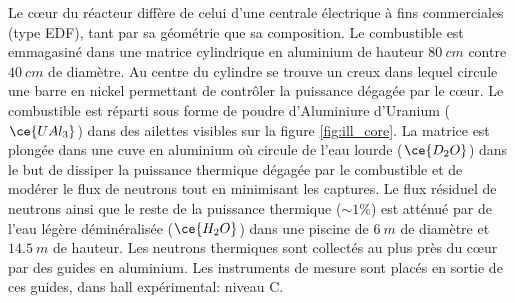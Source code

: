 Le c\oe ur du réacteur diffère de celui d'une centrale électrique à fins commerciales (type EDF), tant par sa géométrie que sa composition. Le combustible est emmagasiné dans une matrice cylindrique en aluminium de hauteur $\SI{80}{cm}$ contre $\SI{40}{cm}$ de diamètre. Au centre du cylindre se trouve un creux dans lequel circule une barre en nickel permettant de contrôler la puissance dégagée par le c\oe ur. Le combustible est réparti sous forme de poudre d'Aluminiure d'Uranium ($\ce{UAl_3}$) \cite{BIST:ILL:1971} dans des ailettes visibles sur la figure \ref{fig:ill_core}. La matrice est plongée dans une cuve en aluminium où circule de l'eau lourde ($\ce{D_2O}$) dans le but de dissiper la puissance thermique dégagée par le combustible et de modérer le flux de neutrons tout en minimisant les captures. Le flux résiduel de neutrons ainsi que le reste de la puissance thermique ($\sim 1 \%$) est atténué par de l'eau légère déminéralisée ($\ce{H_2O}$) dans une piscine de $\SI{6}{m}$ de diamètre et $\SI{14.5}{m}$ de hauteur. Les neutrons thermiques sont collectés au plus près du c\oe ur par des guides en aluminium. Les instruments de mesure sont placés en sortie de ces guides, dans hall expérimental: niveau C.\\ 




